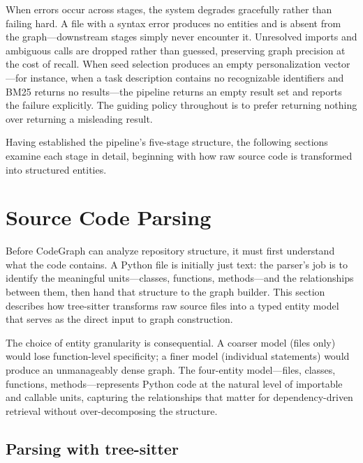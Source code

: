 When errors occur across stages, the system degrades gracefully rather than failing hard. A file with a syntax error produces no entities and is absent from the graph---downstream stages simply never encounter it. Unresolved imports and ambiguous calls are dropped rather than guessed, preserving graph precision at the cost of recall. When seed selection produces an empty personalization vector---for instance, when a task description contains no recognizable identifiers and BM25 returns no results---the pipeline returns an empty result set and reports the failure explicitly. The guiding policy throughout is to prefer returning nothing over returning a misleading result.

Having established the pipeline's five-stage structure, the following sections examine each stage in detail, beginning with how raw source code is transformed into structured entities.


\section{Source Code Parsing}
\label{sec:parsing}

Before CodeGraph can analyze repository structure, it must first understand what the code contains. A Python file is initially just text: the parser's job is to identify the meaningful units---classes, functions, methods---and the relationships between them, then hand that structure to the graph builder. This section describes how tree-sitter transforms raw source files into a typed entity model that serves as the direct input to graph construction.

The choice of entity granularity is consequential. A coarser model (files only) would lose function-level specificity; a finer model (individual statements) would produce an unmanageably dense graph. The four-entity model---files, classes, functions, methods---represents Python code at the natural level of importable and callable units, capturing the relationships that matter for dependency-driven retrieval without over-decomposing the structure.

\subsection{Parsing with tree-sitter}
\label{sec:parsing-treesitter}

